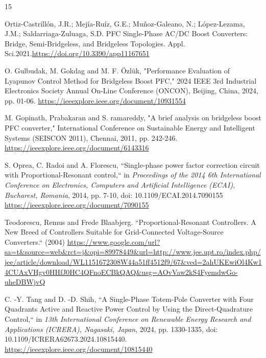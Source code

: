 \documentclass[DIV=calc, paper=a4, fontsize=11pt, twocolumn]{scrartcl}	 %
\begin{document}
\begin{thebibliography}{15} %

Ortiz-Castrillón, J.R.; Mejía-Ruíz, G.E.; Muñoz-Galeano, N.; López-Lezama, J.M.; Saldarriaga-Zuluaga, S.D. PFC Single-Phase AC/DC Boost Converters: Bridge, Semi-Bridgeless, and Bridgeless Topologies. Appl. Sci.2021.\url{https://doi.org/10.3390/app11167651}

 O. Gulbudak, M. Gokdag and M. F. Özlük, "Performance Evaluation of Lyapunov Control Method for Bridgeless Boost PFC," 2024 IEEE 3rd Industrial Electronics Society Annual On-Line Conference (ONCON), Beijing, China, 2024, pp. 01-06. \url{https://ieeexplore.ieee.org/document/10931554}

 M. Gopinath, Prabakaran and S. ramareddy, "A brief analysis on bridgeless boost PFC converter," International Conference on Sustainable Energy and Intelligent Systems (SEISCON 2011), Chennai, 2011, pp. 242-246. \url{https://ieeexplore.ieee.org/document/6143316}

S. Oprea, C. Radoi and A. Florescu, ``Single-phase power factor correction circuit with Proportional-Resonant control,`` in \emph{Proceedings of the 2014 6th International Conference on Electronics, Computers and Artificial Intelligence (ECAI), Bucharest, Romania}, 2014, pp. 7-10, doi: 10.1109/ECAI.2014.7090155 \url{https://ieeexplore.ieee.org/document/7090155}

Teodorescu, Remus and Frede Blaabjerg. ``Proportional-Resonant Controllers. A New Breed of Controllers Suitable for Grid-Connected Voltage-Source Converters.`` (2004) \url{https://www.google.com/url?sa=t&source=web&rct=j&opi=89978449&url=http://www.jee.upt.ro/index.php/jee/article/download/WL1151672308W44a51ff4512f9/67&ved=2ahUKEwiOl4Kw14CUAxVHgv0HHfJ0HC4QFnoECBkQAQ&usg=AOvVaw2kS4FyemdwGo-uheDBWjvQ}

C. -Y. Tang and D. -D. Shih, ``A Single-Phase Totem-Pole Converter with Four Quadrants Active and Reactive Power Control by Using the Direct-Quadrature Control,`` in \emph{13th International Conference on Renewable Energy Research and Applications (ICRERA), Nagasaki, Japan}, 2024, pp. 1330-1335, doi: 10.1109/ICRERA62673.2024.10815440. \url{https://ieeexplore.ieee.org/document/10815440}


\end{thebibliography}
\end{document}
